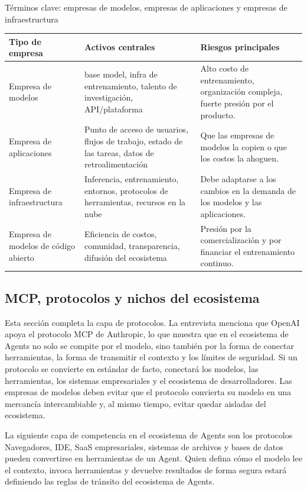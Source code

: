 \begin{knowledgebox}{Términos clave: empresas de modelos, empresas de aplicaciones y empresas de infraestructura}
\noindent\begin{tabularx}{\textwidth}{p{}p{}X}
\toprule
Tipo de empresa & Activos centrales & Riesgos principales \\
\midrule
Empresa de modelos & base model, infra de entrenamiento, talento de investigación, API/plataforma & Alto costo de entrenamiento, organización compleja, fuerte presión por el producto. \\
Empresa de aplicaciones & Punto de acceso de usuarios, flujos de trabajo, estado de las tareas, datos de retroalimentación & Que las empresas de modelos la copien o que los costos la ahoguen. \\
Empresa de infraestructura & Inferencia, entrenamiento, entornos, protocolos de herramientas, recursos en la nube & Debe adaptarse a los cambios en la demanda de los modelos y las aplicaciones. \\
Empresa de modelos de código abierto & Eficiencia de costos, comunidad, transparencia, difusión del ecosistema & Presión por la comercialización y por financiar el entrenamiento continuo. \\
\bottomrule
\end{tabularx}
\end{knowledgebox}

\subsection{MCP, protocolos y nichos del ecosistema}

Esta sección completa la capa de protocolos. La entrevista menciona que OpenAI apoya el protocolo MCP de Anthropic, lo que muestra que en el ecosistema de Agents no solo se compite por el modelo, sino también por la forma de conectar herramientas, la forma de transmitir el contexto y los límites de seguridad. Si un protocolo se convierte en estándar de facto, conectará los modelos, las herramientas, los sistemas empresariales y el ecosistema de desarrolladores. Las empresas de modelos deben evitar que el protocolo convierta su modelo en una mercancía intercambiable y, al mismo tiempo, evitar quedar aisladas del ecosistema.

\begin{importantbox}{La siguiente capa de competencia en el ecosistema de Agents son los protocolos}
Navegadores, IDE, SaaS empresariales, sistemas de archivos y bases de datos pueden convertirse en herramientas de un Agent. Quien defina cómo el modelo lee el contexto, invoca herramientas y devuelve resultados de forma segura estará definiendo las reglas de tránsito del ecosistema de Agents.
\end{importantbox}

